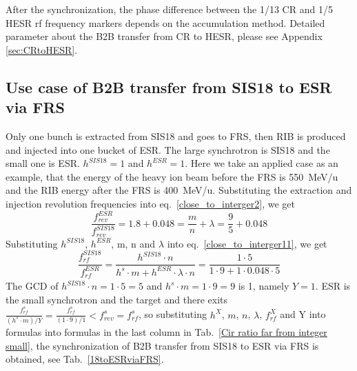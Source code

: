 After the synchronization, the phase difference between the 1/13 CR and 1/5 HESR rf frequency markers depends on the accumulation method. Detailed parameter about the B2B transfer from CR to HESR, please see Appendix \ref{sec:CRtoHESR}. 
\subsection{Use case of B2B transfer from SIS18 to ESR via FRS} 
Only one bunch is extracted from SIS18 and goes to FRS, then RIB is produced and injected into one bucket of ESR. The large synchrotron is SIS18 and the small one is ESR. $h^{\mathit{SIS18}}=1$ and $h^{\mathit{ESR}}=1$. Here we take an applied case as an example, that the energy of the heavy ion beam before the FRS is \SI{550}{MeV/\atomicmassunit} and the RIB energy after the FRS is \SI{400}{MeV/\atomicmassunit}. Substituting the extraction and injection revolution frequencies into eq.~\ref{close_to_interger2}, we get
\begin{equation} 
\frac{f_{\mathit{rev}}^{\mathit{ESR}}}{f_{\mathit{rev}}^{\mathit{SIS18}}}=1.8+0.048=\frac{m}{n}+ \lambda=\frac{9}{5}+0.048
\end{equation}
Substituting $h^{\mathit{SIS18}}$, $h^{\mathit{ESR}}$, m, n and $\lambda$ into eq.~\ref{close_to_interger11}, we get
\begin{equation}
\frac{f_{\mathit{rf}}^{\mathit{SIS18}}}{f_{\mathit{rf}}^{\mathit{ESR}}}=\frac{h^{\mathit{SIS18}}\cdot n}{h^s \cdot m+ h^{\mathit{ESR}} \cdot\lambda\cdot n}=\frac{1\cdot 5}{1 \cdot 9+1 \cdot0.048\cdot 5}
\end{equation}
The GCD of $h^{\mathit{SIS18}}\cdot n=1\cdot5=5$ and $h^s \cdot m=1\cdot 9=9$ is 1, namely $Y=1$. ESR is the small synchrotron and the target and there exits $\frac{f_{\mathit{rf}}^{s}}{(h^s\cdot m)/Y}=\frac{f_{\mathit{rf}}^{s}}{(1\cdot 9)/1}<f_{\mathit{rev}}^{s}=f_{\mathit{rf}}^{s}$, so substituting $h^X$, $m$, $n$, $\lambda$, $f_{\mathit{rf}}^{X}$ and Y into formulas into formulas in the last column in Tab.~\ref{Cir ratio far from integer small}, the synchronization of B2B transfer from SIS18 to ESR via FRS is obtained, see Tab.~\ref{18toESRviaFRS}.

